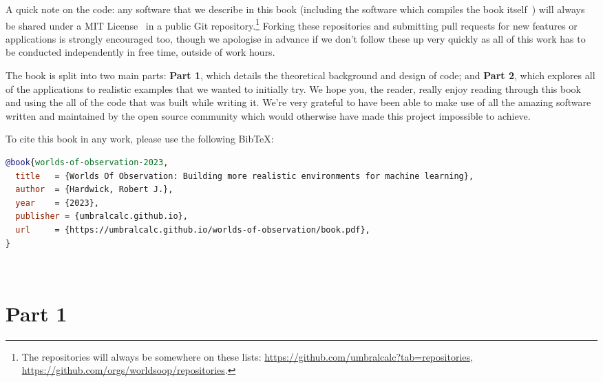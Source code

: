 \documentclass{book}
\begin{document}
A quick note on the code: any software that we describe in this book (including the software which compiles the book itself~\cite{worldsofobservationbookgithub}) will always be shared under a MIT License~\cite{mitlicense} in a public Git repository.\footnote{The repositories will always be somewhere on these lists: \href{https://github.com/umbralcalc?tab=repositories}{https://github.com/umbralcalc?tab=repositories}, \href{https://github.com/orgs/worldsoop/repositories}{https://github.com/orgs/worldsoop/repositories}.} Forking these repositories and submitting pull requests for new features or applications is strongly encouraged too, though we apologise in advance if we don't follow these up very quickly as all of this work has to be conducted independently in free time, outside of work hours.

The book is split into two main parts: {\bfseries\sffamily Part 1}, which details the theoretical background and design of code; and {\bfseries\sffamily Part 2}, which explores all of the applications to realistic examples that we wanted to initially try. We hope you, the reader, really enjoy reading through this book and using the all of the code that was built while writing it. We're very grateful to have been able to make use of all the amazing software written and maintained by the open source community which would otherwise have made this project impossible to achieve.

To cite this book in any work, please use the following BibTeX:
\begin{adjustwidth}{5em}{5em}
\begin{lstlisting}[language=BibTeX,numbers=none]
@book{worlds-of-observation-2023,
  title   = {Worlds Of Observation: Building more realistic environments for machine learning},
  author  = {Hardwick, Robert J.},
  year    = {2023},
  publisher = {umbralcalc.github.io},
  url     = {https://umbralcalc.github.io/worlds-of-observation/book.pdf},
}
\end{lstlisting}
\end{adjustwidth}

\newpage \ \newpage
{\sffamily \tableofcontents}
\mainmatter

\part*{{\sffamily Part 1}}




\end{document}
